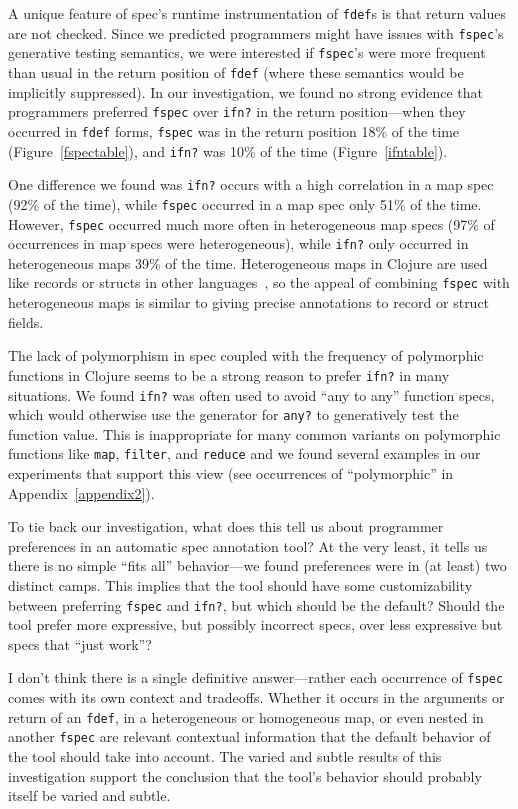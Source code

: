 A unique feature of spec's runtime instrumentation of \texttt{fdef}s is that
return values are not checked. Since we predicted programmers might have
issues with \texttt{fspec}'s generative testing semantics, we were interested
if \texttt{fspec}'s were more frequent than usual in the return position
of \texttt{fdef} (where these semantics would be implicitly suppressed).
In our investigation, we found no strong evidence that programmers preferred
\texttt{fspec} over \texttt{ifn?} in the return position---when they occurred in \texttt{fdef} forms,
\texttt{fspec} was in the return position 18\% of the time (Figure~\ref{fspectable}),
and \texttt{ifn?} was 10\% of the time (Figure~\ref{ifntable}).

One difference we found was \texttt{ifn?} occurs with a high correlation in
a map spec (92\% of the time), while \texttt{fspec} occurred in a map spec
only 51\% of the time.
However, \texttt{fspec} occurred much more often in heterogeneous map specs
(97\% of occurrences in map specs were heterogeneous), while \texttt{ifn?}
only occurred in heterogeneous maps 39\% of the time.
Heterogeneous maps in Clojure are used like records or structs in other
languages~\cite{bonnaire2016practical}, so the appeal of combining
\texttt{fspec} with heterogeneous maps is similar to giving precise annotations
to record or struct fields.

The lack of polymorphism in spec coupled with the frequency of polymorphic functions
in Clojure seems to be a strong reason to prefer \texttt{ifn?} in many situations.
We found \texttt{ifn?} was often used to avoid ``any to any'' function
specs, which would otherwise use the generator for \texttt{any?} to generatively test
the function value. This is inappropriate for many common variants on polymorphic functions like
\texttt{map}, \texttt{filter}, and \texttt{reduce}
and we found several examples in our experiments that support this view
(see occurrences of ``polymorphic'' in Appendix~\ref{appendix2}).


To tie back our investigation, what does this tell us about programmer preferences in an automatic spec annotation
tool? At the very least, it tells us there is no simple ``fits all'' behavior---we found
preferences were in (at least) two distinct camps.
This implies that the tool should have some customizability between preferring
\texttt{fspec} and \texttt{ifn?}, but which should be the default?
Should the tool prefer more expressive, but possibly incorrect specs, over less
expressive but specs that ``just work''?

I don't think there is a single definitive answer---rather each occurrence of \texttt{fspec}
comes with its own context and tradeoffs. Whether it occurs in the arguments or return of
an \texttt{fdef}, in a heterogeneous or homogeneous map, or even nested in another \texttt{fspec}
are relevant contextual information that the default behavior of the tool should take
into account. The varied and subtle results of this investigation support the conclusion
that the tool's behavior should probably itself be varied and subtle.
